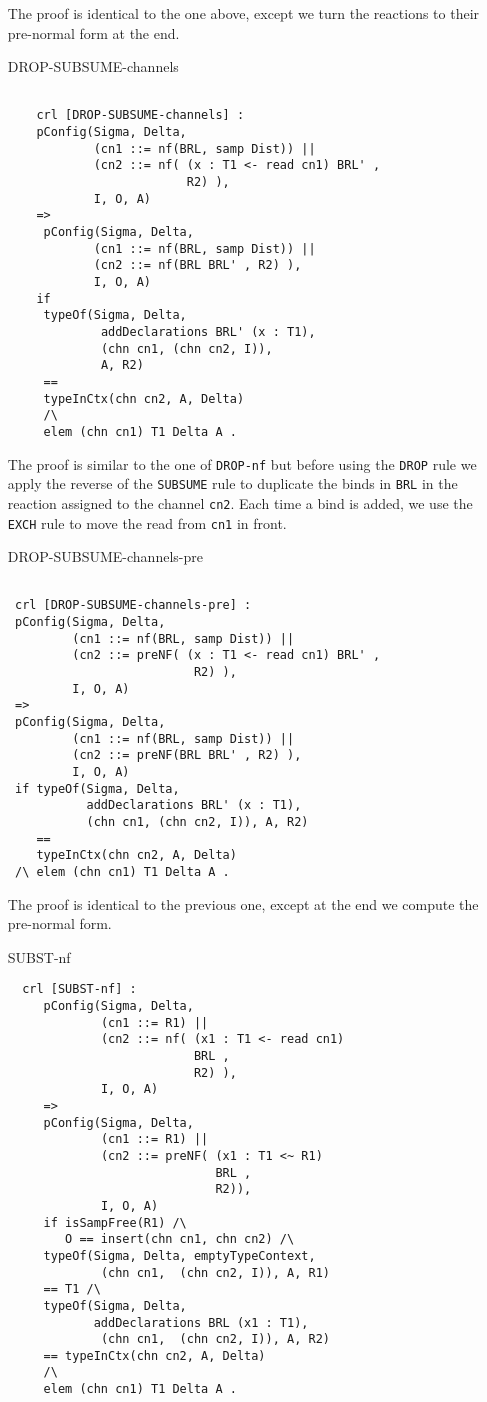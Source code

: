 \documentclass{article}
\begin{document}
\begin{itemize}
 The proof is identical to the one above, except
 we turn the reactions to their pre-normal form at the end.      

\item[DROP-SUBSUME-channels]
 \begin{lstlisting} 
        
    crl [DROP-SUBSUME-channels] :
    pConfig(Sigma, Delta,
            (cn1 ::= nf(BRL, samp Dist)) || 
            (cn2 ::= nf( (x : T1 <- read cn1) BRL' , 
                         R2) ),
            I, O, A) 
    =>           
     pConfig(Sigma, Delta,
            (cn1 ::= nf(BRL, samp Dist)) || 
            (cn2 ::= nf(BRL BRL' , R2) ),
            I, O, A) 
    if 
     typeOf(Sigma, Delta, 
             addDeclarations BRL' (x : T1), 
             (chn cn1, (chn cn2, I)), 
             A, R2) 
     == 
     typeInCtx(chn cn2, A, Delta)
     /\
     elem (chn cn1) T1 Delta A .  
       \end{lstlisting}
 The proof is similar to the one of \verb+DROP-nf+ but before
 using the \verb+DROP+ rule we apply the reverse of the 
 \verb+SUBSUME+ rule to duplicate the binds in \verb+BRL+ in 
 the reaction assigned to the channel \verb+cn2+. Each time a bind
 is added, we use the \verb+EXCH+ rule to move the read from \verb+cn1+
 in front. 

\item[DROP-SUBSUME-channels-pre]
 \begin{lstlisting}

 crl [DROP-SUBSUME-channels-pre] :
 pConfig(Sigma, Delta,
         (cn1 ::= nf(BRL, samp Dist)) || 
         (cn2 ::= preNF( (x : T1 <- read cn1) BRL' , 
                          R2) ),
         I, O, A) 
 =>           
 pConfig(Sigma, Delta,
         (cn1 ::= nf(BRL, samp Dist)) || 
         (cn2 ::= preNF(BRL BRL' , R2) ),
         I, O, A) 
 if typeOf(Sigma, Delta,  
           addDeclarations BRL' (x : T1), 
           (chn cn1, (chn cn2, I)), A, R2) 
    == 
    typeInCtx(chn cn2, A, Delta)
 /\ elem (chn cn1) T1 Delta A . 
       \end{lstlisting}

 The proof is identical to the previous one, except at the end we
 compute the pre-normal form.

\item[SUBST-nf]
 \begin{lstlisting}           
  crl [SUBST-nf] : 
     pConfig(Sigma, Delta,
             (cn1 ::= R1) || 
             (cn2 ::= nf( (x1 : T1 <- read cn1) 
                          BRL , 
                          R2) ),
             I, O, A)  
     => 
     pConfig(Sigma, Delta,
             (cn1 ::= R1) || 
             (cn2 ::= preNF( (x1 : T1 <~ R1)
                             BRL , 
                             R2)),
             I, O, A) 
     if isSampFree(R1) /\
        O == insert(chn cn1, chn cn2) /\ 
     typeOf(Sigma, Delta, emptyTypeContext, 
             (chn cn1,  (chn cn2, I)), A, R1) 
     == T1 /\
     typeOf(Sigma, Delta, 
            addDeclarations BRL (x1 : T1), 
             (chn cn1,  (chn cn2, I)), A, R2) 
     == typeInCtx(chn cn2, A, Delta)
     /\
     elem (chn cn1) T1 Delta A . 
       \end{lstlisting}
       

\end{itemize}
\end{document}
